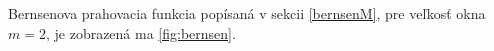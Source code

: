 \documentclass[a4paper,12pt,twoside]{article}%
\begin{document}
Bernsenova prahovacia funkcia popísaná v sekcii \ref{bernsenM}, pre veľkosť okna $m = 2$, je zobrazená ma \ref{fig:bernsen}.

\begin{figure}[H]  
    \hspace{5px}

\end{figure}
\end{document}
